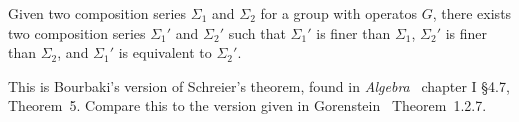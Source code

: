 \begin{theorem}
Given two composition series $\Sigma_{1}$ and $\Sigma_{2}$ for a group
with operatos $G$, there exists two composition series $\Sigma_{1}'$ and $\Sigma_{2}'$
such that $\Sigma_{1}'$ is finer than $\Sigma_{1}$, $\Sigma_{2}'$ is
finer than $\Sigma_{2}$, and $\Sigma_{1}'$ is equivalent to $\Sigma_{2}'$.
\end{theorem}

\begin{thm-remark}
This is Bourbaki's version of Schreier's theorem, found in \emph{Algebra}~\cite{bourbaki1974elements}
chapter I \S4{.}7, Theorem~5. Compare this to the version given in
Gorenstein~\cite{gorenstein1980finite} Theorem~1{.}2{.}7.
\end{thm-remark}
